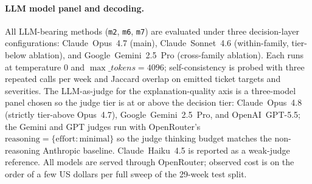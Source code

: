 \paragraph{LLM model panel and decoding.}
All LLM-bearing methods (\texttt{m2}, \texttt{m6}, \texttt{m7}) are
evaluated under three decision-layer configurations: Claude~Opus~4.7
(main), Claude~Sonnet~4.6 (within-family, tier-below ablation), and
Google~Gemini~2.5~Pro (cross-family ablation). Each runs at temperature $0$
and $\max\_tokens=4096$; self-consistency is probed with three repeated
calls per week and Jaccard overlap on emitted ticket targets and
severities. The LLM-as-judge for the explanation-quality axis is a
three-model panel chosen so the judge tier is at or above the decision
tier: Claude~Opus~4.8 (strictly tier-above Opus~4.7),
Google~Gemini~2.5~Pro, and OpenAI~GPT-5.5; the Gemini and GPT judges run
with OpenRouter's $\mathrm{reasoning}=\{\mathrm{effort:minimal}\}$ so the
judge thinking budget matches the non-reasoning Anthropic baseline.
Claude~Haiku~4.5 is reported as a weak-judge reference. All models are
served through OpenRouter; observed cost is on the order of a few US
dollars per full sweep of the 29-week test split.
